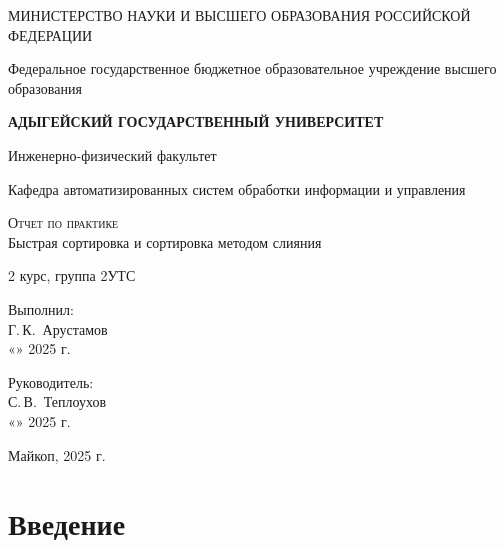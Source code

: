 \documentclass[12pt,a4paper]{scrartcl}
\begin{document}
	\begin{titlepage}
		\begin{center}
			\large
			МИНИСТЕРСТВО НАУКИ И ВЫСШЕГО ОБРАЗОВАНИЯ РОССИЙСКОЙ ФЕДЕРАЦИИ
			
			Федеральное государственное бюджетное образовательное учреждение высшего образования
			
			\textbf{АДЫГЕЙСКИЙ ГОСУДАРСТВЕННЫЙ УНИВЕРСИТЕТ}
			\vspace{0.25cm}
			
			Инженерно-физический факультет
			
			Кафедра автоматизированных систем обработки информации и управления
			\vfill
			
			\textsc{Отчет по практике}\\[5mm]
			
			{\LARGE Быстрая сортировка и сортировка методом слияния \textit{}}
			\bigskip
			
			2 курс, группа 2УТС
		\end{center}
		\vfill
		
		\newlength{\ML}
		\hfill\begin{minipage}{0.5\textwidth}
			Выполнил:\\
			\underline{\hspace{\ML}} Г.\,К.~Арустамов\\
			«\underline{\hspace{0.7cm}}» \underline{\hspace{2cm}} 2025 г.
		\end{minipage}%
		\bigskip
		
		\hfill\begin{minipage}{0.5\textwidth}
			Руководитель:\\
			\underline{\hspace{\ML}} С.\,В.~Теплоухов\\
			«\underline{\hspace{0.7cm}}» \underline{\hspace{2cm}} 2025 г.
		\end{minipage}%
		\vfill
		
		\begin{center}
			Майкоп, 2025 г.
		\end{center}
	\end{titlepage}

    \newpage

\section{Введение}
\label{sec:intro}
\end{document}
